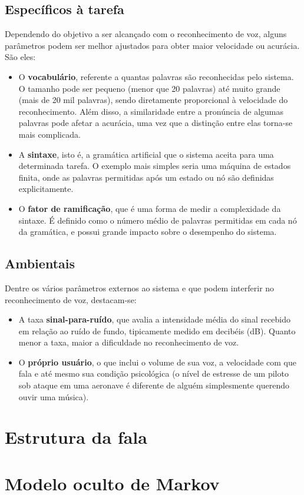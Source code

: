 \subsection{Específicos à tarefa}

Dependendo do objetivo a ser alcançado com o reconhecimento de voz, alguns parâmetros podem ser melhor ajustados para obter maior velocidade ou acurácia. São eles:

\begin{itemize}
\item O \textbf{vocabulário}, referente a quantas palavras são reconhecidas pelo sistema. O tamanho pode ser pequeno (menor que 20 palavras) até muito grande (mais de 20 mil palavras), sendo diretamente proporcional à velocidade do reconhecimento. Além disso, a similaridade entre a pronúncia de algumas palavras pode afetar a acurácia, uma vez que a distinção entre elas torna-se mais complicada.

\item A \textbf{sintaxe}, isto é, a gramática artificial que o sistema aceita para uma determinada tarefa. O exemplo mais simples seria uma máquina de estados finita, onde as palavras permitidas após um estado ou nó são definidas explicitamente.

\item O \textbf{fator de ramificação}, que é uma forma de medir a complexidade da sintaxe. É definido como o número médio de palavras permitidas em cada nó da gramática, e possui grande impacto sobre o desempenho do sistema.
\end{itemize}


\subsection{Ambientais}

Dentre os vários parâmetros externos ao sistema e que podem interferir no reconhecimento de voz, destacam-se:

\begin{itemize}
\item A taxa \textbf{sinal-para-ruído}, que avalia a intensidade média do sinal recebido em relação ao ruído de fundo, tipicamente medido em decibéis (dB). Quanto menor a taxa, maior a dificuldade no reconhecimento de voz.

\item O \textbf{próprio usuário}, o que inclui o volume de sua voz, a velocidade com que fala e até mesmo sua condição psicológica (o nível de estresse de um piloto sob ataque em uma aeronave é diferente de alguém simplesmente querendo ouvir uma música).
\end{itemize}


\section{Estrutura da fala}


\section{Modelo oculto de Markov}

